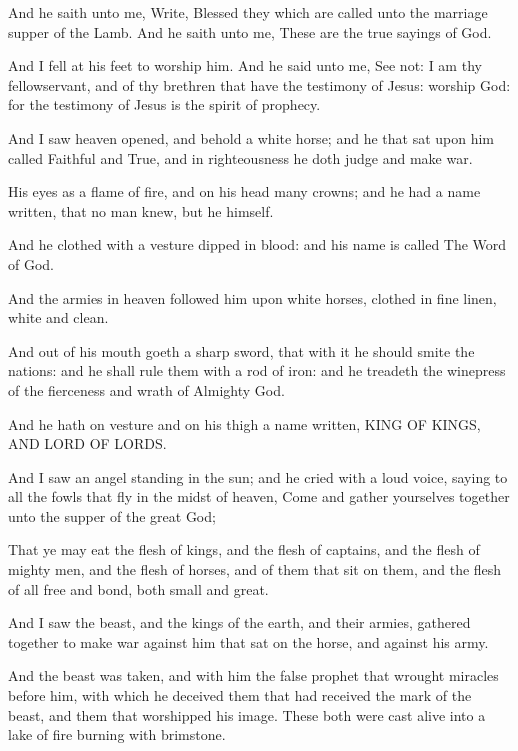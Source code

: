 {And he
saith unto
me,
Write,
Blessed
{} they
which are
called
unto the
marriage
supper of the
Lamb.
And he
saith unto
me,
These
are the
true
sayings of
God.

And I
fell
at
his
feet to
worship
him.
And he
said unto
me,
See
{}
not: I
am
thy
fellowservant,
and of
thy
brethren that
have the
testimony of
Jesus:
worship
God:
for the
testimony of
Jesus
is the
spirit of
prophecy.

And I
saw
heaven
opened,
and
behold a
white
horse;
and he that
sat
upon
him
{}
called
Faithful
and
True,
and
in
righteousness he doth
judge
and make
war.

His
eyes
{}
as a
flame of
fire,
and
on
his
head
{}
many
crowns;
and he
had a
name
written,
that no
man
knew,
but he
himself.

And
he
{} clothed
with a
vesture
dipped in
blood:
and
his
name is
called The
Word of
God.

And the
armies
{}
in
heaven
followed
him
upon
white
horses, clothed
in fine
linen,
white
and
clean.

And out
of
his
mouth
goeth a
sharp
sword,
that
with
it he should
smite the
nations:
and
he shall
rule
them
with a
rod of
iron:
and
he
treadeth the
winepress of the
fierceness
and
wrath of
Almighty
God.

And he
hath
on
{}
vesture
and
on
his
thigh a name
written,
KING OF
KINGS,
AND
LORD OF
LORDS.


\par }{\PP {}And I
saw
an
angel
standing
in the
sun;
and he
cried with a
loud
voice,
saying to
all the
fowls that
fly
in the midst of
heaven,
Come
and gather yourselves
together
unto the
supper of the
great
God;

That ye may
eat the
flesh of
kings,
and the
flesh of
captains,
and the
flesh of mighty
men,
and the
flesh of
horses,
and of
them that
sit
on
them,
and the
flesh of
all
{}
free
and
bond,
both
small
and
great.

And I
saw the
beast,
and the
kings of the
earth,
and
their
armies, gathered
together to
make
war
against
him that
sat
on the
horse,
and
against
his
army.

And the
beast was
taken,
and
with
him the false
prophet that
wrought
miracles
before
him,
with
which he
deceived
them that had
received the
mark of the
beast,
and
them that
worshipped
his
image. These
both were
cast
alive
into a
lake of
fire
burning
with
brimstone.

}
